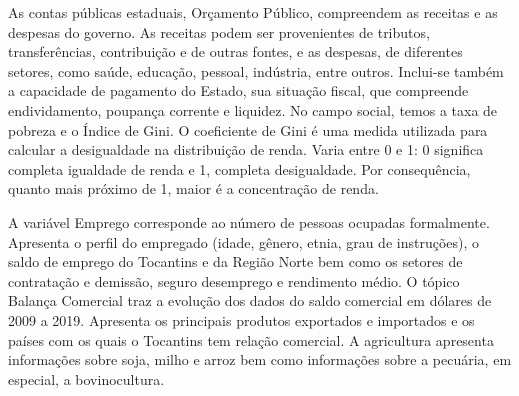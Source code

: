 \begin{center}
{		\par As contas públicas estaduais, Orçamento Público, compreendem as receitas e as despesas do governo. As receitas podem ser provenientes de tributos, transferências, contribuição e de outras fontes, e as despesas, de diferentes setores, como saúde, educação, pessoal, indústria, entre outros. Inclui-se também a capacidade de pagamento do Estado, sua situação fiscal, que compreende endividamento, poupança corrente e liquidez. No campo social, temos a taxa de pobreza e o Índice de Gini. O coeficiente de Gini é uma medida utilizada para calcular a desigualdade na distribuição de renda. Varia entre 0 e 1:   0 significa completa igualdade de renda e 1, completa desigualdade. Por consequência, quanto mais próximo de 1, maior é a concentração de renda. 
		\par A variável Emprego corresponde ao número de pessoas ocupadas formalmente. Apresenta o perfil do empregado (idade, gênero, etnia, grau de instruções), o saldo de emprego do Tocantins e da Região Norte bem como os setores de contratação e demissão, seguro desemprego e rendimento médio. 
		O tópico Balança Comercial traz a evolução dos dados do saldo comercial em dólares de 2009 a 2019. Apresenta os principais produtos exportados e importados e os países    com os quais    o Tocantins tem relação comercial. A agricultura apresenta informações sobre soja, milho e arroz bem como informações sobre a pecuária, em especial, a bovinocultura. 
	}
\end{center}
\thispagestyle{empty}
